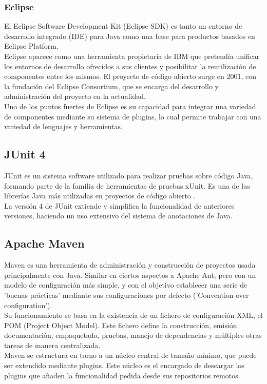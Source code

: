 \subsubsection{Eclipse}

El Eclipse Software Development Kit (Eclipse SDK) es tanto un entorno de desarrollo integrado (IDE) para Java como una base para productos basados en Eclipse Platform.
\\
Eclipse aparece como una herramienta propietaria de IBM que pretendía unificar los entornos de desarrollo ofrecidos a sus clientes y posibilitar la reutilización de componentes entre los mismos.
El proyecto de código abierto surge en 2001, con la fundación del Eclipse Consortium, que se encarga del desarrollo y administración del proyecto en la actualidad. \cite{website:eclipseFAQ}
\\
Uno de los puntos fuertes de Eclipse es su capacidad para integrar una variedad de componentes mediante su sistema de plugins, lo cual permite trabajar con una variedad de lenguajes y herramientas.

\subsection{JUnit 4}

JUnit es un sistema software utilizado para realizar pruebas sobre código Java, formando parte de la familia de herramientas de pruebas xUnit.
Es una de las librerías Java más utilizadas en proyectos de código abierto \cite{website:githubTOP}.
\\
La versión 4 de JUnit extiende y simplifica la funcionalidad de anteriores versiones, haciendo un uso extensivo del sistema de anotaciones de Java.

\subsection{Apache Maven}

Maven es una herramienta de administración y construcción de proyectos usada principalmente con Java.
Similar en ciertos aspectos a Apache Ant, pero con un modelo de configuración más simple, y con el objetivo establecer una serie de 'buenas prácticas' mediante sus configuraciones por defecto ('Convention over configuration').
\\
Su funcionamiento se basa en la existencia de un fichero de configuración XML, el POM (Project Object Model).
Este fichero define la construcción, emisión documentación, empaquetado, pruebas, manejo de dependencias y múltiples otras tareas de manera centralizada\cite{mvnEx}.
\\
Maven se estructura en torno a un núcleo central de tamaño mínimo, que puede ser extendido mediante plugins.
Este núcleo es el encargado de descargar los plugins que añaden la funcionalidad pedida desde sus repositorios remotos.


